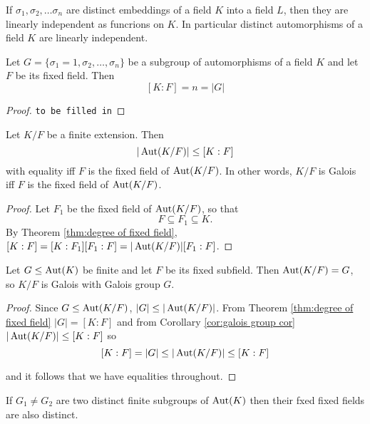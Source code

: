 \documentclass[a4paper]{article}
\begin{document}
\begin{corollary}
  If $\sigma_1, \sigma_2, \ldots \sigma_n$ are distinct embeddings of a field $K$ into a field $L$, then they are linearly independent as funcrions on $K$. In particular distinct automorphisms of a field $K$ are linearly independent.
\end{corollary}

\begin{theorem}\label{thm:degree of fixed field}
  Let $G = \{\sigma_1=1, \sigma_2,\ldots, \sigma_n\}$ be a subgroup of automorphisms of a field $K$ and let $F$ be its fixed field. Then
  \[ [K:F] = n = |G| \]
\end{theorem}

\begin{proof}
  \texttt{to be filled in}
\end{proof}

\begin{corollary}
  \label{cor:upper bound of order of aut group}
  Let $K/F$ be a finite extension. Then
  \[ |\operatorname{Aut}(K/F)| \leq [K:F] \]
  with equality iff $F$ is the fixed field of $\operatorname{Aut}(K/F)$. In other words, $K/F$ is Galois iff $F$ is the fixed field of $\operatorname{Aut}(K/F)$.
\end{corollary}

\begin{proof}
  Let $F_1$ be the fixed field of $\operatorname{Aut}(K/F)$, so that
  \[ F \subseteq F_1 \subseteq K. \]
  By Theorem \ref{thm:degree of fixed field}, $[K:F] = [K:F_1][F_1:F] = |\operatorname{Aut}(K/F)| [F_1:F]$.
\end{proof}

\begin{corollary}\label{cor:galois group cor}
  Let $G \leq \operatorname{Aut}(K)$ be finite and let $F$ be its fixed subfield. Then $\operatorname{Aut}(K/F) = G$, so $K/F$ is Galois with Galois group $G$.
\end{corollary}

\begin{proof}
  Since $G \leq \operatorname{Aut}(K/F)$, $|G| \leq |\operatorname{Aut}(K/F)|$. From Theorem \ref{thm:degree of fixed field} $|G| = [K:F]$ and from Corollary \ref{cor:galois group cor} $|\operatorname{Aut}(K/F)| \leq [K:F]$ so
  \[ [K:F] = |G| \leq |\operatorname{Aut}(K/F)| \leq [K:F] \]

  and it follows that we have equalities throughout.
\end{proof}

\begin{corollary}
  \label{cor:unique fixed field}
  If $G_1 \neq G_2$ are two distinct finite subgroups of $\operatorname{Aut}(K)$ then their fxed fixed fields are also distinct.
\end{corollary}
\end{document}
